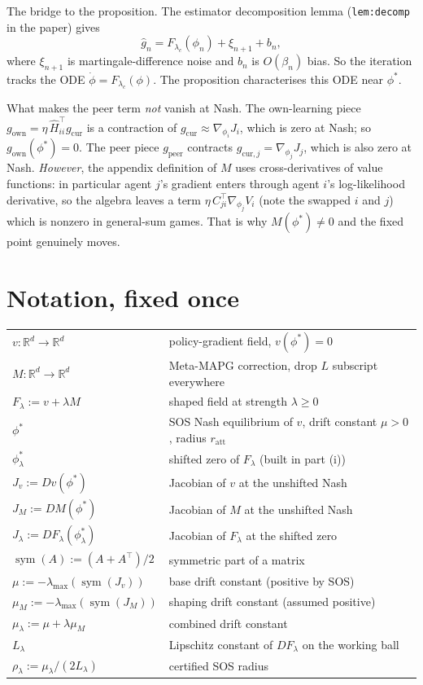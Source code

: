 \documentclass[11pt]{article}
\newcommand{\R}{\mathbb{R}}
\newcommand{\sym}{\operatorname{sym}}
\begin{document}
The bridge to the proposition. The estimator decomposition lemma (\verb|lem:decomp| in the paper) gives
\[
\widehat{g}_n = F_{\lambda_c}(\phi_n) + \xi_{n+1} + b_n,
\]
where $\xi_{n+1}$ is martingale-difference noise and $b_n$ is $O(\beta_n)$ bias. So the iteration tracks the ODE $\dot\phi = F_{\lambda_c}(\phi)$. The proposition characterises this ODE near $\phi^*$.

What makes the peer term \emph{not} vanish at Nash. The own-learning piece $g_{\mathrm{own}} = \eta\, \widehat{H}_{ii}^\top g_{\mathrm{cur}}$ is a contraction of $g_{\mathrm{cur}} \approx \nabla_{\phi_i} J_i$, which is zero at Nash; so $g_{\mathrm{own}}(\phi^*) = 0$. The peer piece $g_{\mathrm{peer}}$ contracts $g_{\mathrm{cur},j} = \nabla_{\phi_j} J_j$, which is also zero at Nash. \emph{However}, the appendix definition of $M$ uses cross-derivatives of value functions: in particular agent $j$'s gradient enters through agent $i$'s log-likelihood derivative, so the algebra leaves a term $\eta\, C_{ji}^\top \nabla_{\phi_j} V_i$ (note the swapped $i$ and $j$) which is nonzero in general-sum games. That is why $M(\phi^*) \ne 0$ and the fixed point genuinely moves.

\section{Notation, fixed once}\label{sec:notation}

\begin{tabular}{ll}
$v : \R^d \to \R^d$ & policy-gradient field, $v(\phi^*) = 0$ \\
$M : \R^d \to \R^d$ & Meta-MAPG correction, drop $L$ subscript everywhere \\
$F_\lambda := v + \lambda M$ & shaped field at strength $\lambda \ge 0$ \\
$\phi^*$ & SOS Nash equilibrium of $v$, drift constant $\mu > 0$, radius $r_{\mathrm{att}}$ \\
$\phi^*_\lambda$ & shifted zero of $F_\lambda$ (built in part (i)) \\
$J_v := Dv(\phi^*)$ & Jacobian of $v$ at the unshifted Nash \\
$J_M := DM(\phi^*)$ & Jacobian of $M$ at the unshifted Nash \\
$J_\lambda := DF_\lambda(\phi^*_\lambda)$ & Jacobian of $F_\lambda$ at the shifted zero \\
$\sym(A) := (A + A^\top)/2$ & symmetric part of a matrix \\
$\mu := -\lambda_{\max}(\sym(J_v))$ & base drift constant (positive by SOS) \\
$\mu_M := -\lambda_{\max}(\sym(J_M))$ & shaping drift constant (assumed positive) \\
$\mu_\lambda := \mu + \lambda \mu_M$ & combined drift constant \\
$L_\lambda$ & Lipschitz constant of $DF_\lambda$ on the working ball \\
$\rho_\lambda := \mu_\lambda / (2 L_\lambda)$ & certified SOS radius
\end{tabular}
\end{document}
